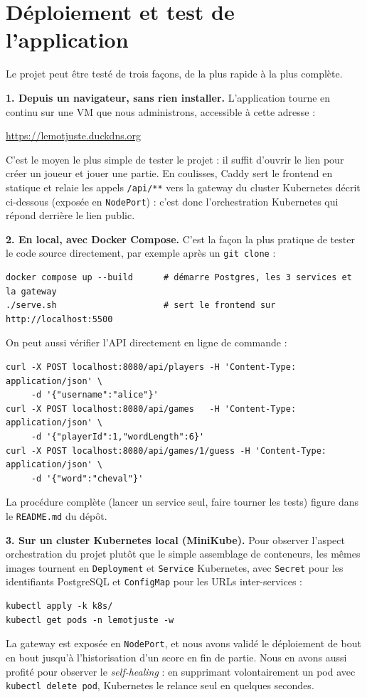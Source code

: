 \documentclass[11pt,a4paper]{article}
\begin{document}
\section{Déploiement et test de l'application}
Le projet peut être testé de trois façons, de la plus rapide à la plus complète.

\textbf{1. Depuis un navigateur, sans rien installer.} L'application tourne en
continu sur une VM que nous administrons, accessible à cette adresse :
\begin{center}\url{https://lemotjuste.duckdns.org}\end{center}
C'est le moyen le plus simple de tester le projet : il suffit d'ouvrir le lien pour
créer un joueur et jouer une partie. En coulisses, Caddy sert le frontend en statique
et relaie les appels \texttt{/api/**} vers la gateway du cluster Kubernetes décrit
ci-dessous (exposée en \texttt{NodePort}) : c'est donc l'orchestration Kubernetes qui
répond derrière le lien public.

\textbf{2. En local, avec Docker Compose.} C'est la façon la plus pratique de tester
le code source directement, par exemple après un \texttt{git clone} :
\small
\begin{verbatim}
docker compose up --build      # démarre Postgres, les 3 services et la gateway
./serve.sh                     # sert le frontend sur http://localhost:5500
\end{verbatim}
\normalsize
On peut aussi vérifier l'API directement en ligne de commande :
\small
\begin{verbatim}
curl -X POST localhost:8080/api/players -H 'Content-Type: application/json' \
     -d '{"username":"alice"}'
curl -X POST localhost:8080/api/games   -H 'Content-Type: application/json' \
     -d '{"playerId":1,"wordLength":6}'
curl -X POST localhost:8080/api/games/1/guess -H 'Content-Type: application/json' \
     -d '{"word":"cheval"}'
\end{verbatim}
\normalsize
La procédure complète (lancer un service seul, faire tourner les tests) figure dans le
\texttt{README.md} du dépôt.

\textbf{3. Sur un cluster Kubernetes local (MiniKube).} Pour observer l'aspect
orchestration du projet plutôt que le simple assemblage de conteneurs, les mêmes
images tournent en \texttt{Deployment} et \texttt{Service} Kubernetes, avec
\texttt{Secret} pour les identifiants PostgreSQL et \texttt{ConfigMap} pour les URLs
inter-services :
\small
\begin{verbatim}
kubectl apply -k k8s/
kubectl get pods -n lemotjuste -w
\end{verbatim}
\normalsize
La gateway est exposée en \texttt{NodePort}, et nous avons validé le déploiement de
bout en bout jusqu'à l'historisation d'un score en fin de partie. Nous en avons aussi
profité pour observer le \textit{self-healing} : en supprimant volontairement un pod
avec \texttt{kubectl delete pod}, Kubernetes le relance seul en quelques secondes.
\end{document}
